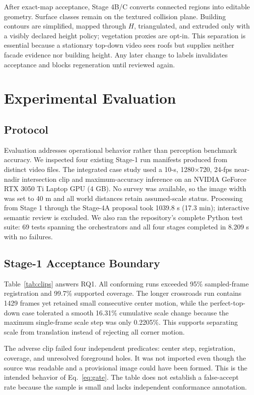 \documentclass[letterpaper,conference]{IEEEtran}
\begin{document}
After exact-map acceptance, Stage 4B/C converts connected regions into editable geometry. Surface classes remain on the textured collision plane. Building contours are simplified, mapped through $H$, triangulated, and extruded only with a visibly declared height policy; vegetation proxies are opt-in. This separation is essential because a stationary top-down video sees roofs but supplies neither facade evidence nor building height. Any later change to labels invalidates acceptance and blocks regeneration until reviewed again.

\section{Experimental Evaluation}
\subsection{Protocol}
Evaluation addresses operational behavior rather than perception benchmark accuracy. We inspected four existing Stage-1 run manifests produced from distinct video files. The integrated case study used a 10-s, 1280$\times$720, 24-fps near-nadir intersection clip and maximum-accuracy inference on an NVIDIA GeForce RTX 3050 Ti Laptop GPU (4 GB). No survey was available, so the image width was set to 40 m and all world distances retain assumed-scale status. Processing from Stage 1 through the Stage-4A proposal took 1039.8 s (17.3 min); interactive semantic review is excluded. We also ran the repository's complete Python test suite: 69 tests spanning the orchestrators and all four stages completed in 8.209 s with no failures.

\subsection{Stage-1 Acceptance Boundary}
Table~\ref{tab:clips} answers RQ1. All conforming runs exceeded 95\% sampled-frame registration and 99.7\% supported coverage. The longer crossroads run contains 1429 frames yet retained small consecutive center motion, while the perfect-top-down case tolerated a smooth 16.31\% cumulative scale change because the maximum single-frame scale step was only 0.2205\%. This supports separating scale from translation instead of rejecting all corner motion.

The adverse clip failed four independent predicates: center step, registration, coverage, and unresolved foreground holes. It was not imported even though the source was readable and a provisional image could have been formed. This is the intended behavior of Eq.~\eqref{eq:gate}. The table does not establish a false-accept rate because the sample is small and lacks independent conformance annotation.
\end{document}
